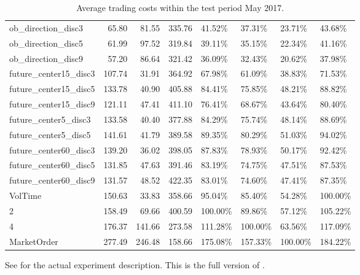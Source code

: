 \begin{table}[ht]
{\begin{tabular}{lrrrllll}
\midrule
ob\_direction\_disc3           &     65.80 &   81.55 &  335.76 &   41.52\% &   37.31\% &   23.71\% &       43.68\% \\
ob\_direction\_disc5           &     61.99 &   97.52 &  319.84 &   39.11\% &   35.15\% &   22.34\% &       41.16\% \\
ob\_direction\_disc9           &     57.20 &   86.64 &  321.42 &   36.09\% &   32.43\% &   20.62\% &       37.98\% \\
future\_center15\_disc3        &    107.74 &   31.91 &  364.92 &   67.98\% &   61.09\% &   38.83\% &       71.53\% \\
future\_center15\_disc5        &    133.78 &   40.90 &  405.88 &   84.41\% &   75.85\% &   48.21\% &       88.82\% \\
future\_center15\_disc9        &    121.11 &   47.41 &  411.10 &   76.41\% &   68.67\% &   43.64\% &       80.40\% \\
future\_center5\_disc3         &    133.58 &   40.40 &  377.88 &   84.29\% &   75.74\% &   48.14\% &       88.69\% \\
future\_center5\_disc5         &    141.61 &   41.79 &  389.58 &   89.35\% &   80.29\% &   51.03\% &       94.02\% \\
future\_center60\_disc3        &    139.20 &   36.02 &  398.05 &   87.83\% &   78.93\% &   50.17\% &       92.42\% \\
future\_center60\_disc5        &    131.85 &   47.63 &  391.46 &   83.19\% &   74.75\% &   47.51\% &       87.53\% \\
future\_center60\_disc9        &    131.57 &   48.52 &  422.35 &   83.01\% &   74.60\% &   47.41\% &       87.35\% \\
\midrule
VolTime                      &    150.63 &   33.83 &  358.66 &   95.04\% &   85.40\% &   54.28\% &      100.00\% \\
2                            &    158.49 &   69.66 &  400.59 &  100.00\% &   89.86\% &   57.12\% &      105.22\% \\
4                            &    176.37 &  141.66 &  273.58 &  111.28\% &  100.00\% &   63.56\% &      117.09\% \\
MarketOrder                  &    277.49 &  246.48 &  158.66 &  175.08\% &  157.33\% &  100.00\% &      184.22\% \\
\bottomrule
\end{tabular}}

        		\caption[Full version of ]{Average trading costs within the test period May 2017.}
		See  for the actual experiment description. This is the full version of .
		\label{tab:eval:additionalMarketVariables:fulltable}

\end{table}




